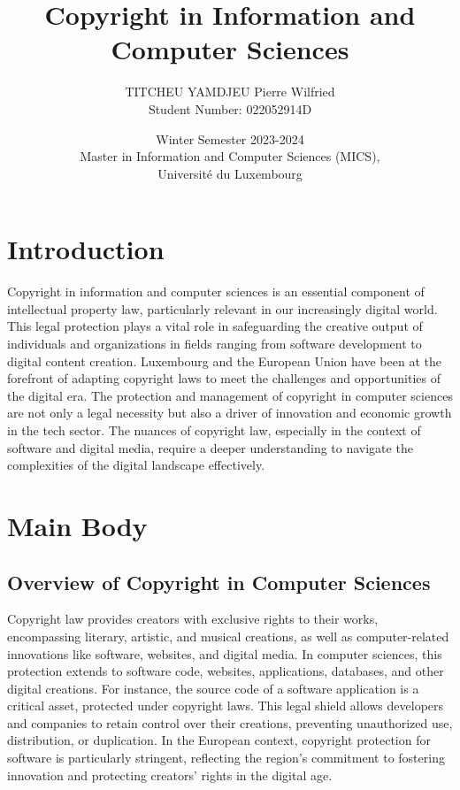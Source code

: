 \documentclass[10pt,a4paper]{article}
\title{Copyright in Information and Computer Sciences}
\author{TITCHEU YAMDJEU Pierre Wilfried \\
        Student Number: 022052914D}
\date{Winter Semester 2023-2024 \\ Master in Information and Computer Sciences (MICS), \\ Université du Luxembourg}
\begin{document}
\maketitle

\section*{Introduction}
Copyright in information and computer sciences is an essential component of intellectual property law, particularly relevant in our increasingly digital world. This legal protection plays a vital role in safeguarding the creative output of individuals and organizations in fields ranging from software development to digital content creation. Luxembourg and the European Union have been at the forefront of adapting copyright laws to meet the challenges and opportunities of the digital era. The protection and management of copyright in computer sciences are not only a legal necessity but also a driver of innovation and economic growth in the tech sector. The nuances of copyright law, especially in the context of software and digital media, require a deeper understanding to navigate the complexities of the digital landscape effectively.

\section*{Main Body}
\subsection*{Overview of Copyright in Computer Sciences}
Copyright law provides creators with exclusive rights to their works, encompassing literary, artistic, and musical creations, as well as computer-related innovations like software, websites, and digital media. In computer sciences, this protection extends to software code, websites, applications, databases, and other digital creations. For instance, the source code of a software application is a critical asset, protected under copyright laws. This legal shield allows developers and companies to retain control over their creations, preventing unauthorized use, distribution, or duplication. In the European context, copyright protection for software is particularly stringent, reflecting the region's commitment to fostering innovation and protecting creators' rights in the digital age.
\end{document}
